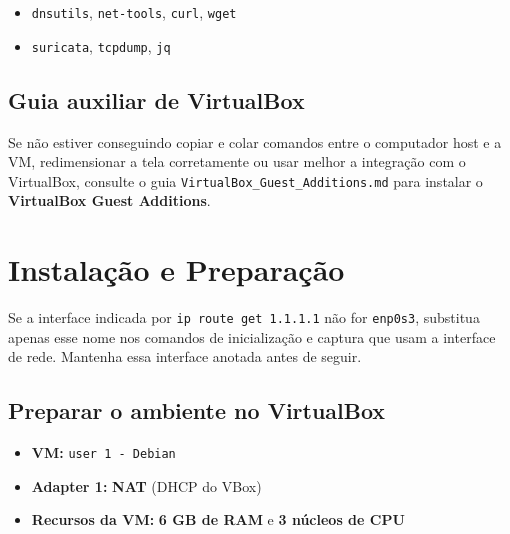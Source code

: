 \begin{itemize}
  \item \texttt{dnsutils}, \texttt{net-tools}, \texttt{curl}, \texttt{wget}
  \item \texttt{suricata}, \texttt{tcpdump}, \texttt{jq}
\end{itemize}

\subsection{Guia auxiliar de VirtualBox}

\begin{notebox}
Se não estiver conseguindo copiar e colar comandos entre o computador host e a VM, redimensionar a tela corretamente ou usar melhor a integração com o VirtualBox, consulte o guia \texttt{VirtualBox\_Guest\_Additions.md} para instalar o \textbf{VirtualBox Guest Additions}.
\end{notebox}

\section{Instalação e Preparação}

\begin{notebox}
Se a interface indicada por \texttt{ip route get 1.1.1.1} não for \texttt{enp0s3}, substitua apenas esse nome nos comandos de inicialização e captura que usam a interface de rede. Mantenha essa interface anotada antes de seguir.
\end{notebox}

\subsection{Preparar o ambiente no VirtualBox}

\begin{itemize}
  \item \textbf{VM:} \texttt{user 1 - Debian}
  \item \textbf{Adapter 1:} \textbf{NAT} (DHCP do VBox)
\end{itemize}


\begin{itemize}
  \item \textbf{Recursos da VM:} \textbf{6 GB de RAM} e \textbf{3 núcleos de CPU}
\end{itemize}

